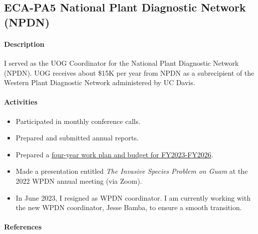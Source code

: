 \subsection{ECA-PA5 National Plant Diagnostic Network (NPDN)}
\begin{refsection}

\paragraph{Description}	

I served as the UOG Coordinator for the National Plant Diagnostic Network (NPDN). UOG receives about \$15K per year from NPDN as a subrecipient of the Western Plant Diagnostic Network administered by UC Davis. 


\paragraph{Activities}

\begin{itemize}
	\item Participated in monthly conference calls.
	\item Prepared and submitted annual reports.
	\item Prepared a \href{https://github.com/aubreymoore/WPDN/raw/main/4year/WPDN\%20FY23-FY26\%20workplan\%20and\%20budget\%20for\%20UOG.pdf}{four-year work plan and budget for FY2023-FY2026}.
	\item Made a presentation entitled \textit{The Invasive Species Problem on Guam} \cite{moore_invasive_2022} at the 2022 WPDN annual meeting (via Zoom).
	\item In June 2023, I resigned as WPDN coordinator.
	I am currently working with the new WPDN coordinator, Jesse Bamba, to ensure a smooth transition.
\end{itemize}

\paragraph{References}
\printbibliography[heading=none]
\end{refsection}	

